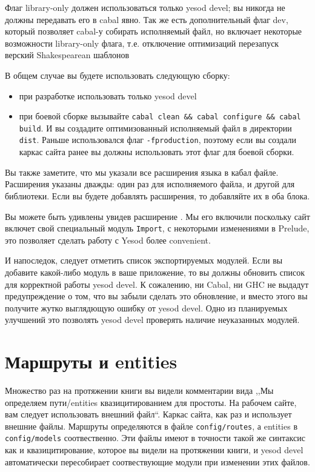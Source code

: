 Флаг library-only должен использоваться только yesod devel; вы никогда не должны передавать его в 
cabal явно. Так же есть дополнительный флаг dev, который позволяет cabal-у собирать исполняемый файл,
но включает некоторые возможности library-only флага, т.е. отключение оптимизаций перезапуск
верский Shakespearean шаблонов

В общем случае вы будете использовать следующую сборку:
\begin{itemize}
    \item при разработке использовать только yesod devel
    \item при боевой сборке вызывайте \lstinline!cabal clean && cabal configure && cabal build!. И вы
        создадите оптимизованный исполняемый файл в директории \texttt{dist}. Раньше использовался флаг
        \lstinline!-fproduction!, поэтому если вы создали каркас сайта ранее вы должны использовать этот
        флаг для боевой сборки.
\end{itemize}

Вы также заметите, что мы указали все расширения языка в кабал файле. Расширения указаны дважды:
один раз для исполняемого файла, и другой для библиотеки. Если вы будете добавлять расширения, то
добавляйте их в оба блока.

Вы можете быть удивлены увидев расширение . Мы его включили поскольку сайт 
включет свой специальный модуль \lstinline!Import!, с некоторыми изменениями в Prelude, это позволяет
сделать работу с Yesod более convenient.

И напоследок, следует отметить список экспортируемых модулей. Если вы добавите какой-либо модуль в 
ваше приложение, то вы должны обновить список для корректной работы yesod devel. К сожалению,
ни Cabal, ни GHC не выдадут предупреждение о том, что вы забыли сделать это обновление, и вместо этого
вы получите жутко выглядющую ошибку от yesod devel. Одно из планируемых улучшений это позволять yesod
devel проверять наличие неуказанных модулей.

\section{Маршруты и entities}

Множество раз на протяжении книги вы видели комментарии вида ,,Мы определяем пути/entities квазицитированием для простоты. 
На рабочем сайте, вам следует использовать внешний файл``. Каркас сайта, как раз и использует внешние файлы.
Маршруты определяются в файле \texttt{config/routes}, а entities в \texttt{config/models} соотвественно. Эти файлы
имеют в точности такой же синтаксис как и квазицитирование, которое вы видели на протяжении книги, и yesod devel 
автоматически пересобирает соотвествующие модули при изменении этих файлов.

